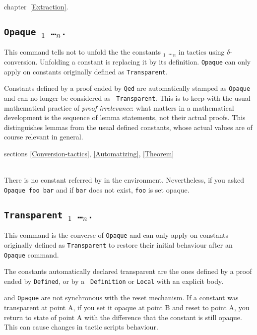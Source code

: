 \SeeAlso chapter~\ref{Extraction}.

\subsection{\tt Opaque \qualid$_1$ \dots \qualid$_n$.}
\label{Opaque} This command tells not to unfold the
the constants {\qualid$_1$} \dots {\qualid$_n$} in tactics using
$\delta$-conversion. Unfolding a constant is replacing it by its
definition. {\tt Opaque} can only apply on constants originally
defined as {\tt Transparent}.

Constants defined by a proof ended by {\tt Qed} are automatically
stamped as {\tt Opaque} and can no longer be considered as {\tt
Transparent}. This is to keep with the usual mathematical practice of
{\em proof irrelevance}: what matters in a mathematical development is
the sequence of lemma statements, not their actual proofs. This
distinguishes lemmas from the usual defined constants, whose actual
values are of course relevant in general.

\SeeAlso sections \ref{Conversion-tactics}, \ref{Automatizing},
\ref{Theorem}

\begin{ErrMsgs}
\item {}\\
    There is no constant referred by {\qualid} in the environment.
    Nevertheless, if you asked \texttt{Opaque foo bar}
    and if \texttt{bar} does not exist, \texttt{foo} is set opaque.
\end{ErrMsgs}

\subsection{\tt Transparent \qualid$_1$ \dots \qualid$_n$.}
\label{Transparent}
This command is the converse of {\tt Opaque} and can only apply on constants originally defined as {\tt Transparent} to restore their initial behaviour after an {\tt Opaque} command.

The constants automatically declared transparent are the ones defined by a proof ended by {\tt Defined}, or by a {\tt
  Definition} or {\tt Local} with an explicit body.

 and \texttt{Opaque} are not synchronous
with the reset mechanism. If a constant was transparent at point A, if
you set it opaque at point B and reset to point A, you return to state
of point A with the difference that the constant is still opaque. This
can cause changes in tactic scripts behaviour.

